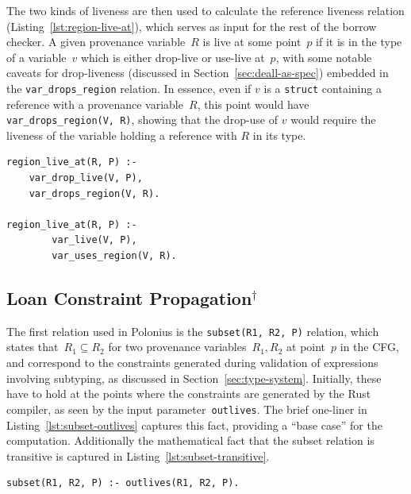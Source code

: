 \documentclass[11pt,a4paper,twoside,openany]{report}
\newcommand{\notmine}[0] {$^\dagger$}
\newenvironment{sourcecode}{\captionsetup{type=listing}}{}
\newcommand{\InRust}[1]{\texttt{#1}}
\newcommand{\InDatalog}[1]{\texttt{#1}}
\begin{document}
The two kinds of liveness are then used to calculate the reference liveness
relation (Listing~\ref{lst:region-live-at}), which serves as input for the rest
of the borrow checker. A given provenance variable~$R$ is live at some point~$p$
if it is in the type of a variable~$v$ which is either drop-live or use-live
at~$p$, with some notable caveats for drop-liveness (discussed in
Section~\ref{sec:deall-as-spec}) embedded in the \InDatalog{var_drops_region}
relation. In essence, even if $v$ is a \InRust{struct} containing a reference
with a provenance variable~$R$, this point would have
\InDatalog{var_drops_region(V, R)}, showing that the drop-use of $v$ would
require the liveness of the variable holding a reference with $R$ in its type.

\begin{sourcecode}
  \label{lst:region-live-at}
\begin{verbatim}
region_live_at(R, P) :-
    var_drop_live(V, P),
    var_drops_region(V, R).
        
region_live_at(R, P) :-
        var_live(V, P),
        var_uses_region(V, R).
\end{verbatim}
\end{sourcecode}

\subsection{Loan Constraint Propagation\notmine{}}\label{sec:loan-constr-prop}

The first relation used in Polonius is the \InDatalog{subset(R1, R2, P)}
relation, which states that~$R_1 \subseteq R_2$ for two provenance
variables~$R_1, R_2$ at point~$p$ in the CFG, and correspond to the constraints
generated during validation of expressions involving subtyping, as discussed in
Section~\ref{sec:type-system}. Initially, these have to hold at the points where
the constraints are generated by the Rust compiler, as seen by the input
parameter~\InDatalog{outlives}. The brief one-liner in
Listing~\ref{lst:subset-outlives} captures this fact, providing a ``base case''
for the computation. Additionally the mathematical fact that the subset relation
is transitive is captured in Listing~\ref{lst:subset-transitive}.

\begin{sourcecode}
  \label{lst:subset-outlives}
\begin{verbatim}
subset(R1, R2, P) :- outlives(R1, R2, P).
\end{verbatim}
\end{sourcecode}
\end{document}
